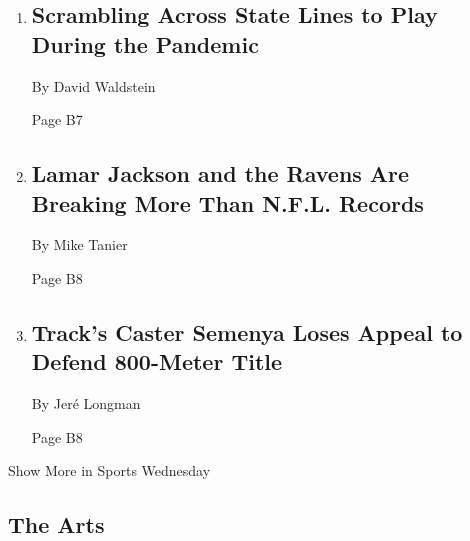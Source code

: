 \begin{enumerate}
\def\labelenumi{\arabic{enumi}.}
\item
  \href{/2020/09/03/sports/ncaafootball/high-school-football-coronavirus-pandemic.html}{}

  \hypertarget{scrambling-across-state-lines-to-play-during-the-pandemic-1}{%
  \subsection{Scrambling Across State Lines to Play During the
  Pandemic}\label{scrambling-across-state-lines-to-play-during-the-pandemic-1}}

  By David Waldstein

  Page B7
\item
  \href{/2020/09/09/sports/football/lamar-jackson-ravens.html}{}

  \hypertarget{lamar-jackson-and-the-ravens-are-breaking-more-than-nfl-records}{%
  \subsection{Lamar Jackson and the Ravens Are Breaking More Than N.F.L.
  Records}\label{lamar-jackson-and-the-ravens-are-breaking-more-than-nfl-records}}

  By Mike Tanier

  Page B8
\item
  \href{/2020/09/08/sports/olympics/caster-semenya-court-ruling.html}{}

  \hypertarget{tracks-caster-semenya-loses-appeal-to-defend-800-meter-title}{%
  \subsection{Track's Caster Semenya Loses Appeal to Defend 800-Meter
  Title}\label{tracks-caster-semenya-loses-appeal-to-defend-800-meter-title}}

  By Jeré Longman

  Page B8
\end{enumerate}

Show More in Sports Wednesday

\hypertarget{the-arts}{%
\subsection{The Arts}\label{the-arts}}

